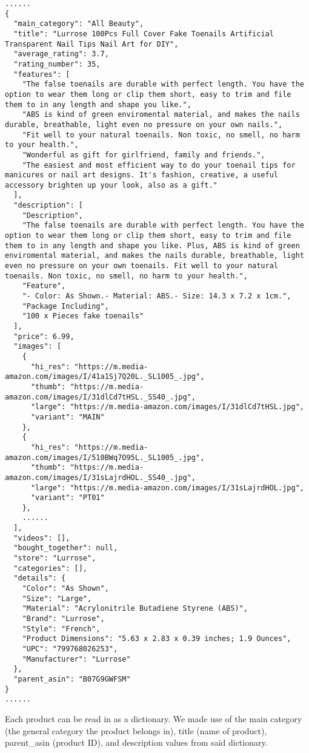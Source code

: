 \documentclass[fontsize=11pt]{article}
\begin{document}
\begin{verbatim}
......
{
  "main_category": "All Beauty",
  "title": "Lurrose 100Pcs Full Cover Fake Toenails Artificial Transparent Nail Tips Nail Art for DIY",
  "average_rating": 3.7,
  "rating_number": 35,
  "features": [
    "The false toenails are durable with perfect length. You have the option to wear them long or clip them short, easy to trim and file them to in any length and shape you like.",
    "ABS is kind of green enviromental material, and makes the nails durable, breathable, light even no pressure on your own nails.",
    "Fit well to your natural toenails. Non toxic, no smell, no harm to your health.",
    "Wonderful as gift for girlfriend, family and friends.",
    "The easiest and most efficient way to do your toenail tips for manicures or nail art designs. It's fashion, creative, a useful accessory brighten up your look, also as a gift."
  ],
  "description": [
    "Description",
    "The false toenails are durable with perfect length. You have the option to wear them long or clip them short, easy to trim and file them to in any length and shape you like. Plus, ABS is kind of green enviromental material, and makes the nails durable, breathable, light even no pressure on your own toenails. Fit well to your natural toenails. Non toxic, no smell, no harm to your health.",
    "Feature",
    "- Color: As Shown.- Material: ABS.- Size: 14.3 x 7.2 x 1cm.",
    "Package Including",
    "100 x Pieces fake toenails"
  ],
  "price": 6.99,
  "images": [
    {
      "hi_res": "https://m.media-amazon.com/images/I/41a1Sj7Q20L._SL1005_.jpg",
      "thumb": "https://m.media-amazon.com/images/I/31dlCd7tHSL._SS40_.jpg",
      "large": "https://m.media-amazon.com/images/I/31dlCd7tHSL.jpg",
      "variant": "MAIN"
    },
    {
      "hi_res": "https://m.media-amazon.com/images/I/510BWq7O95L._SL1005_.jpg",
      "thumb": "https://m.media-amazon.com/images/I/31sLajrdHOL._SS40_.jpg",
      "large": "https://m.media-amazon.com/images/I/31sLajrdHOL.jpg",
      "variant": "PT01"
    },
    ......
  ],
  "videos": [],
  "bought_together": null,
  "store": "Lurrose",
  "categories": [],
  "details": {
    "Color": "As Shown",
    "Size": "Large",
    "Material": "Acrylonitrile Butadiene Styrene (ABS)",
    "Brand": "Lurrose",
    "Style": "French",
    "Product Dimensions": "5.63 x 2.83 x 0.39 inches; 1.9 Ounces",
    "UPC": "799768026253",
    "Manufacturer": "Lurrose"
  },
  "parent_asin": "B07G9GWFSM"
}
......
\end{verbatim}
Each product can be read in as a dictionary. We made use of the main category (the general category the product belongs in), title (name of product), parent\_asin (product ID), and description values from said dictionary.
\end{document}
